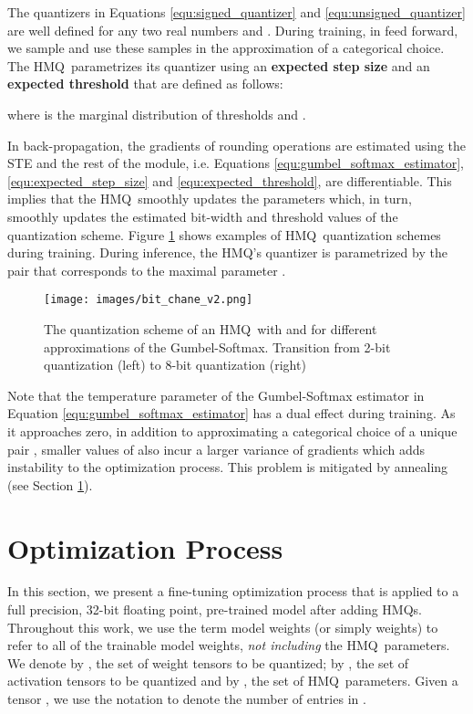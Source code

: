 \documentclass{article}
\newcommand{\qb}{HMQ}
\begin{document}
The quantizers in Equations \ref{equ:signed_quantizer} and \ref{equ:unsigned_quantizer} are well defined for any two real numbers  and .
During training, in feed forward, we sample  and use these samples in the approximation  of a categorical choice.
The \qb\ parametrizes its quantizer  using an \textbf{expected step size}  and an \textbf{expected threshold}  that are defined as follows:


where  is the marginal distribution of thresholds and .



In back-propagation, the gradients of rounding operations are estimated using the STE and the rest of the module, i.e. Equations \ref{equ:gumbel_softmax_estimator}, \ref{equ:expected_step_size} and \ref{equ:expected_threshold}, are differentiable.
This implies that the \qb\ smoothly updates the parameters  which, in turn, smoothly updates the estimated bit-width and threshold values of the quantization scheme.
Figure \ref{fig:transition} shows examples of \qb\ quantization schemes during training.
During inference, the \qb's quantizer is parametrized by the pair  that corresponds to the maximal parameter .
\begin{figure}
	\centering
	\texttt{[image: images/bit\_chane\_v2.png]}
	\caption{
		The quantization scheme of an \qb\ with  and  for different approximations of the Gumbel-Softmax. 
		Transition from 2-bit quantization  (left) to 8-bit quantization  (right)
	}
	\label{fig:transition}
\end{figure}

Note that the temperature parameter  of the Gumbel-Softmax estimator in Equation \ref{equ:gumbel_softmax_estimator} has a dual effect during training. 
As it approaches zero, in addition to approximating a categorical choice of a unique pair , smaller values of  also incur a larger variance of gradients which adds instability to the optimization process.
This problem is mitigated by annealing  (see Section \ref{sec:method}).
 \section{Optimization Process}\label{sec:method}
In this section, we present a fine-tuning optimization process that is applied to a full precision, \mbox{32-bit} floating point, pre-trained model after adding \qb s.
Throughout this work, we use the term model weights (or simply weights) to refer to all of the trainable model weights, \textit{not including} the \qb\ parameters.
We denote by , the set of weight tensors to be quantized; by , the set of activation tensors to be quantized and by , the set of \qb\ parameters.
Given a tensor , we use the notation  to denote the number of entries in .\\
\end{document}

